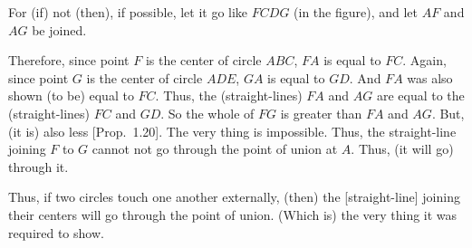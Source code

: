 \begin{Parallel}{}{}
{For (if) not (then), if possible, let it go like $FCDG$ (in the figure), and let $AF$ and
$AG$ be joined.

Therefore, since point $F$ is the center of circle $ABC$, $FA$ is equal to $FC$.
Again, since point $G$ is the center of circle $ADE$, $GA$ is equal to $GD$.
And $FA$ was also shown (to be)  equal to $FC$. Thus, the (straight-lines)
$FA$ and $AG$ are equal to the (straight-lines) $FC$ and $GD$. So the whole
of $FG$ is greater than $FA$ and $AG$. But, (it is) also less [Prop.~1.20].
The very thing is impossible. Thus, the straight-line joining $F$ to $G$
cannot not go through the point of union at $A$. Thus, (it will go) through it.

Thus, if two circles touch one another externally, (then) the [straight-line]
joining their centers will go through the point of union. (Which is)
the very thing it was required to show.}
\end{Parallel}

